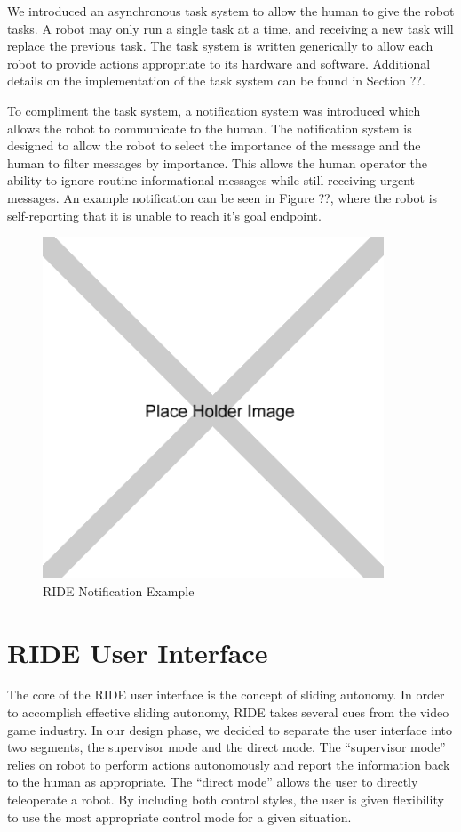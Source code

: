 We introduced an asynchronous task system to allow the human to give the robot tasks. A robot may only run a single task at a time, and receiving a new task will replace the previous task. The task system is written generically to allow each robot to provide actions appropriate to its hardware and software. Additional details on the implementation of the task system can be found in Section ??.

To compliment the task system, a notification system was introduced which allows the robot to communicate to the human. The notification system is designed to allow the robot to select the importance of the message and the human to filter messages by importance. This allows the human operator the ability to ignore routine informational messages while still receiving urgent messages. An example notification can be seen in Figure ??, where the robot is self-reporting that it is unable to reach it's goal endpoint.

\begin{figure}[ht]
\begin{center}
\includegraphics[width=4.0in]{images/placeholder.png}
\caption{RIDE Notification Example\label{fig:ride-notification}}
\end{center}
\end{figure}

\section{RIDE User Interface}

The core of the RIDE user interface is the concept of sliding autonomy. In order to accomplish effective sliding autonomy, RIDE takes several cues from the video game industry. In our design phase, we decided to separate the user interface into two segments, the supervisor mode and the direct mode. The ``supervisor mode'' relies on robot to perform actions autonomously and report the information back to the human as appropriate. The ``direct mode'' allows the user to directly teleoperate a robot. By including both control styles, the user is given flexibility to use the most appropriate control mode for a given situation.

